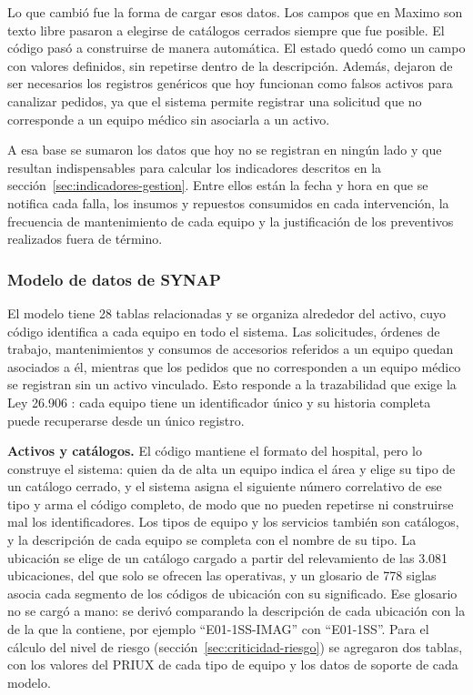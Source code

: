 \documentclass[10pt]{article}
\begin{document}
Lo que cambió fue la forma de cargar esos datos. Los campos que en Maximo son texto libre pasaron a elegirse de catálogos cerrados siempre que fue posible. El código pasó a construirse de manera automática. El estado quedó como un campo con valores definidos, sin repetirse dentro de la descripción. Además, dejaron de ser necesarios los registros genéricos que hoy funcionan como falsos activos para canalizar pedidos, ya que el sistema permite registrar una solicitud que no corresponde a un equipo médico sin asociarla a un activo.

A esa base se sumaron los datos que hoy no se registran en ningún lado y que resultan indispensables para calcular los indicadores descritos en la sección~\ref{sec:indicadores-gestion}. Entre ellos están la fecha y hora en que se notifica cada falla, los insumos y repuestos consumidos en cada intervención, la frecuencia de mantenimiento de cada equipo y la justificación de los preventivos realizados fuera de término.


\subsubsection{Modelo de datos de SYNAP}
\label{sec:modelo-datos}
El modelo tiene 28 tablas relacionadas y se organiza alrededor del activo, cuyo código identifica a cada equipo en todo el sistema. Las solicitudes, órdenes de trabajo, mantenimientos y consumos de accesorios referidos a un equipo quedan asociados a él, mientras que los pedidos que no corresponden a un equipo médico se registran sin un activo vinculado. Esto responde a la trazabilidad que exige la Ley 26.906 \cite{ley_26906}: cada equipo tiene un identificador único y su historia completa puede recuperarse desde un único registro.

\textbf{Activos y catálogos.} El código mantiene el formato del hospital, pero lo construye el sistema: quien da de alta un equipo indica el área y elige su tipo de un catálogo cerrado, y el sistema asigna el siguiente número correlativo de ese tipo y arma el código completo, de modo que no pueden repetirse ni construirse mal los identificadores. Los tipos de equipo y los servicios también son catálogos, y la descripción de cada equipo se completa con el nombre de su tipo. La ubicación se elige de un catálogo cargado a partir del relevamiento de las 3.081 ubicaciones, del que solo se ofrecen las operativas, y un glosario de 778 siglas asocia cada segmento de los códigos de ubicación con su significado. Ese glosario no se cargó a mano: se derivó comparando la descripción de cada ubicación con la de la que la contiene, por ejemplo “E01-1SS-IMAG” con “E01-1SS”. Para el cálculo del nivel de riesgo (sección~\ref{sec:criticidad-riesgo}) se agregaron dos tablas, con los valores del PRIUX de cada tipo de equipo y los datos de soporte de cada modelo.
\end{document}
